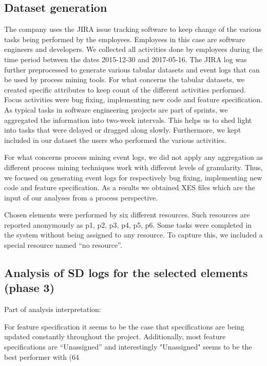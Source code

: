 \subsection{Dataset generation}

The company uses the JIRA issue tracking software to keep change of the various tasks being performed by the employees. Employees in this case are software engineers and developers. We collected all activities done by employees during the time period between the dates 2015-12-30 and 2017-05-16.  The JIRA log was further preprocessed to generate various tabular datasets and event logs that can be used by process mining tools. For what concerns the tabular datasets, we created specific attributes to keep count of the different activities performed. Focus activities were bug fixing, implementing new code and feature specification. As typical tasks in software engineering projects are part of sprints, we aggregated the information into two-week intervals. This helps us to shed light into tasks that were delayed or dragged along slowly. Furthermore, we kept included in our dataset the users who performed the various activities.  

For what concerns process mining event logs, we did not apply any aggregation as different process mining techniques work with different levels of granularity. Thus, we focused on generating event logs for respectively bug fixing, implementing new code and feature specification. As a results we obtained XES files which are the input of our analyses from a process perspective. 

Chosen elements were performed by six different resources. Such resources are reported anonymously as p1, p2, p3, p4, p5, p6. Some tasks were completed in the system without being assigned to any resource. To capture this, we included a special resource named “no resource”.  

\subsection{Analysis of SD logs for the selected elements (phase 3)}

Part of analysis interpretation: 

For feature specification it seems to be the case that specifications are being updated constantly throughout the project. Additionally, most feature specifications are “Unassigned” and interestingly "Unassigned" seems to be the best performer with (64%

